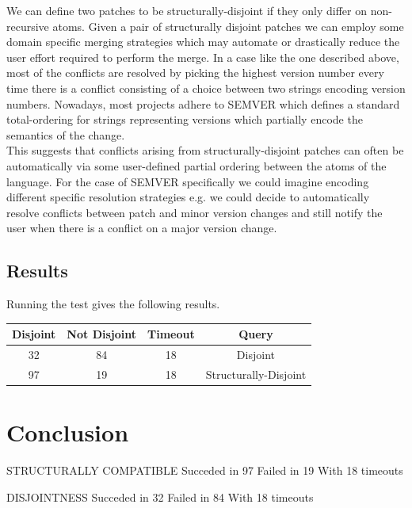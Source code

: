 \documentclass[11pt, titlepage]{article}
\begin{document}
We can define two patches to be structurally-disjoint if they only differ on non-recursive atoms. Given a pair of structurally disjoint patches we can employ some domain specific merging strategies which may automate or drastically reduce the user effort required to perform the merge. In a case like the one described above, most of the conflicts are resolved by picking the highest version number every time there is a conflict consisting of a choice between two strings encoding version numbers. Nowadays, most projects adhere to SEMVER \cite{semver} which defines a standard total-ordering for strings representing versions which partially encode the semantics of the change. 
\\
This suggests that conflicts arising from structurally-disjoint patches can often be automatically via some user-defined partial ordering between the atoms of the language. For the case of SEMVER specifically we could imagine encoding different specific resolution strategies e.g. we could decide to automatically resolve conflicts between patch and minor version changes and still notify the user when there is a conflict on a major version change.

\subsection{Results}
Running the test gives the following results.

\begin{center}
 \begin{tabular} { ||c|c|c|c|| }
   \hline Disjoint & Not Disjoint & Timeout & Query \\
   \hline
   \hline 32 & 84 & 18 & Disjoint \\
   \hline 97 & 19 & 18 & Structurally-Disjoint \\
   \hline
 \end{tabular}
\end{center}
\section{Conclusion}

STRUCTURALLY COMPATIBLE 
Succeded in 97
Failed in 19
With 18 timeouts

DISJOINTNESS
Succeded in 32
Failed in 84
With 18 timeouts
\end{document}
